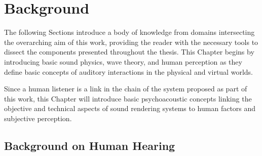 \chapter{Background}\label{ch:background}

The following Sections introduce a body of knowledge from domains intersecting the overarching aim of this work, providing the reader with the necessary tools to dissect the components presented throughout the thesis. This Chapter begins by introducing basic sound physics, wave theory, and human perception as they define basic concepts of auditory interactions in the physical and virtual worlds.\par
Since a human listener is a link in the chain of the system proposed as part of this work, this Chapter will introduce basic psychoacoustic concepts linking the objective and technical aspects of sound rendering systems to human factors and subjective perception.

\section{Background on Human Hearing}
